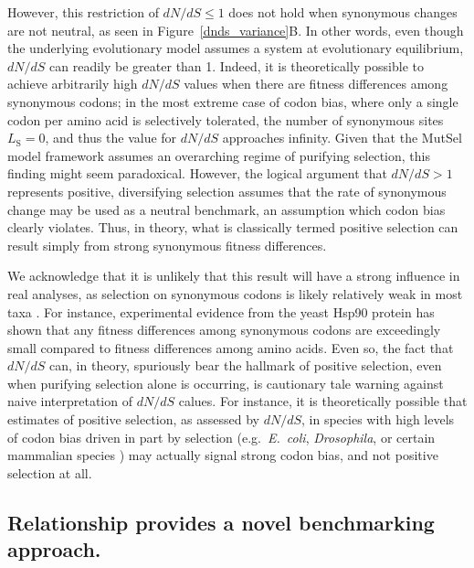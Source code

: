 \documentclass[11pt]{article}
\begin{document}
However, this restriction of $dN/dS \leq 1$ does not hold when synonymous changes are not neutral, as seen in Figure~\ref{dnds_variance}B. In other words, even though the underlying evolutionary model assumes a system at evolutionary equilibrium, $dN/dS$ can readily be greater than 1. Indeed, it is theoretically possible to achieve arbitrarily high $dN/dS$ values when there are fitness differences among synonymous codons; in the most extreme case of codon bias, where only a single codon per amino acid is selectively tolerated, the number of synonymous sites $L_\text{S} = 0$, and thus the value for $dN/dS$ approaches infinity. Given that the MutSel model framework assumes an overarching regime of purifying selection, this finding might seem paradoxical. However, the logical argument that $dN/dS > 1$ represents positive, diversifying selection assumes that the rate of synonymous change may be used as a neutral benchmark, an assumption which codon bias clearly violates. Thus, in theory, what is classically termed positive selection can result simply from strong synonymous fitness differences. 	
		
We acknowledge that it is unlikely that this result will have a strong influence in real analyses, as selection on synonymous codons is likely relatively weak in most taxa \cite{HershbergPetrov2008}. For instance, experimental evidence from the yeast Hsp90 protein has shown that any fitness differences among synonymous codons are exceedingly small compared to fitness differences among amino acids.  Even so, the fact that $dN/dS$ can, in theory, spuriously bear the hallmark of positive selection, even when purifying selection alone is occurring, is cautionary tale warning against naive interpretation of $dN/dS$ calues. For instance, it is theoretically possible that estimates of positive selection, as assessed by $dN/dS$, in species with high levels of codon bias driven in part by selection (e.g.\ \emph{E.\ coli}, \emph{Drosophila}, or certain mammalian species \cite{Duret2002, Chamaryetal2006, PlotkinKudla2010}) may actually signal strong codon bias, and not positive selection at all. 

\subsection*{Relationship provides a novel benchmarking approach.}
\end{document}
